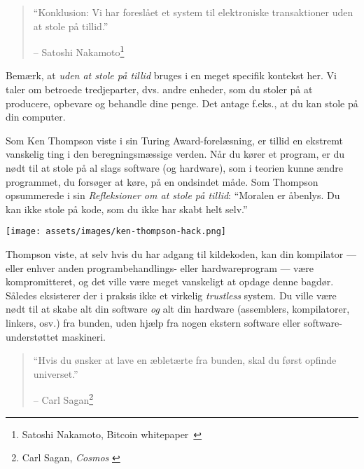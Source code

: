\begin{quotation}\begin{samepage}
\enquote{Konklusion: Vi har foreslået et system til elektroniske transaktioner
uden at stole på tillid.}
\begin{flushright} -- Satoshi Nakamoto\footnote{Satoshi Nakamoto, Bitcoin 
  whitepaper~\cite{whitepaper}}
\end{flushright}\end{samepage}\end{quotation}

Bemærk, at \textit{uden at stole på tillid} bruges i en meget specifik kontekst
her. Vi taler om betroede tredjeparter, dvs. andre enheder,
som du stoler på at producere, opbevare og behandle dine penge. Det antage 
f.eks., at du kan stole på din computer.

Som Ken Thompson viste i sin Turing Award-forelæsning, er tillid en
ekstremt vanskelig ting i den beregningsmæssige verden. Når du kører et
program, er du nødt til at stole på al slags software (og hardware), som
i teorien kunne ændre programmet, du forsøger at køre, på en ondsindet
måde. Som Thompson opsummerede i sin \textit{Refleksioner om at stole på 
tillid}:
\enquote{Moralen er åbenlys. Du kan ikke stole på kode, som du ikke har skabt
helt selv.}~\cite{trusting-trust}

\begin{center}
  \texttt{[image: assets/images/ken-thompson-hack.png]}
  \label{fig:ken-thompson-hack}
\end{center}

Thompson viste, at selv hvis du har adgang til kildekoden,
kan din kompilator --- eller enhver anden programbehandlings- eller
hardwareprogram --- være kompromitteret, og det ville være
meget vanskeligt at opdage denne bagdør. Således eksisterer der i praksis ikke
et virkelig \textit{trustless} system. Du ville være nødt til at skabe alt 
din software \textit{og} alt din hardware (assemblers, kompilatorer, linkers,
osv.) fra bunden, uden hjælp fra nogen ekstern software eller 
software-understøttet maskineri.

\begin{quotation}\begin{samepage}
\enquote{Hvis du ønsker at lave en æbletærte fra bunden, skal du først opfinde
universet.}
\begin{flushright} -- Carl Sagan\footnote{Carl Sagan, \textit{Cosmos} \cite{cosmos}}
\end{flushright}\end{samepage}\end{quotation}


